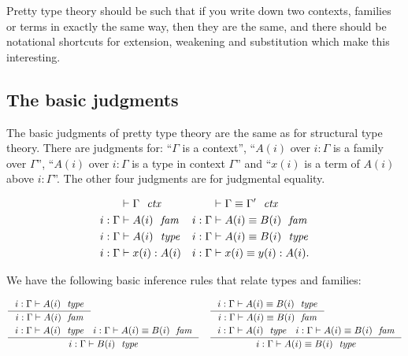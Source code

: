 Pretty type theory should be such that if you write down two contexts, families
or terms in exactly the same way, then they are the same, and there should be
notational shortcuts for extension, weakening and substitution which make
this interesting.

\subsection{The basic judgments}
The basic judgments of pretty type theory are the same as for structural type
theory. There are judgments for: ``$\Gamma$ is a context'',
``$A(i)$ over $i:\Gamma$ is a family over $\Gamma$'', ``$A(i)$ over $i:\Gamma$ 
is a type in context $\Gamma$''
and ``$x(i)$ is a term of $A(i)$ above $i:\Gamma$''. The other four
judgments are for judgmental equality. 

\begin{align*}
\jvctx*{\Gamma} & \jvctxeq*{\Gamma}{\Gamma'}\\
\jvfam*{i}{\Gamma}{A} & \jvfameq*{i}{\Gamma}{A}{B}\\
\jvtype*{i}{\Gamma}{A} & \jvtypeeq*{i}{\Gamma}{A}{B}\\
\jvterm*{i}{\Gamma}{A}{x} & \jvtermeq*{i}{\Gamma}{A}{x}{y}.
\end{align*}

We have the following basic inference rules that relate types and families:

\begin{small}
\begin{align*}
& \inference
  {\jvtype{i}{\Gamma}{A}}
  {\jvfam{i}{\Gamma}{A}}
& & \inference
    {\jvtypeeq{i}{\Gamma}{A}{B}}
    {\jvfameq{i}{\Gamma}{A}{B}}\\
& \inference
  {\jvtype{i}{\Gamma}{A}
   \jvfameq{i}{\Gamma}{A}{B}}
  {\jvtype{i}{\Gamma}{B}}
& & \inference
    {\jvtype{i}{\Gamma}{A}
     \jvfameq{i}{\Gamma}{A}{B}}
    {\jvtypeeq{i}{\Gamma}{A}{B}}
\end{align*}
\end{small}

